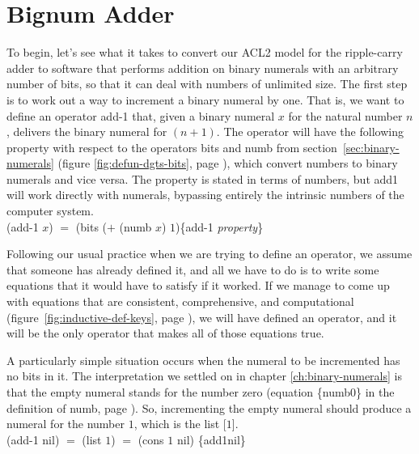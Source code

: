\section{Bignum Adder}
\label{sec:bignum-adder}

To begin, let's see what it takes to convert our ACL2 model for
the ripple-carry adder to software that performs addition on
binary numerals with an arbitrary number of bits,
so that it can deal with numbers of unlimited size.
The first step is to work out a way to increment a
binary numeral by one.
That is,
we want to define an operator \textsf{add-1} that, given a
binary numeral $x$ for the natural number $n$, delivers the
binary numeral for $(n+1)$.
The operator will have the following
property with respect to the operators \textsf{bits} and \textsf{numb} from
section~\ref{sec:binary-numerals}
(figure \ref{fig:defun-dgts-bits}, page \pageref{fig:defun-dgts-bits}),
which convert numbers to binary numerals and vice versa.
The property is stated in terms of numbers,
but \textsf{add1} will work directly with numerals,
bypassing entirely the intrinsic numbers of the computer system.
\\
\vspace{2mm}
\hspace*{2cm}
\textsf{(add-1 $x$)} $=$ \textsf{(bits ($+$ (numb $x$) $1$)}\hfill\{add-1 \emph{property}\}

Following our usual practice when we are trying to define an operator,
we assume that someone has already defined it,
and all we have to do is to write some equations that it
would have to satisfy if it worked. If we manage
to come up with equations that are consistent, comprehensive, and computational
(figure~\ref{fig:inductive-def-keys}, page \pageref{fig:inductive-def-keys}),
we will have defined an operator,
and it will be the only operator that makes all of those equations true.

A particularly simple situation occurs when the numeral to be incremented
has no bits in it. The interpretation we settled on
in chapter \ref{ch:binary-numerals} is that
the empty numeral stands for the number zero
(equation \{numb0\} in the definition of \textsf{numb}, page \pageref{nmb-defun}).
So, incrementing the empty numeral should produce a numeral for the number $1$,
which is the list \textsf{[$1$]}.
\\
\vspace{2mm}
\hspace*{2cm}
\textsf{(add-1 nil)} $=$ \textsf{(list $1$)} $=$ \textsf{(cons $1$ nil)}  \hfill \{add1nil\}

